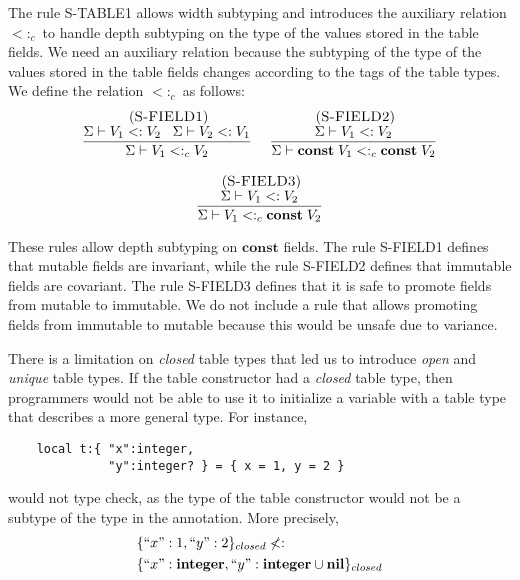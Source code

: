 \documentclass{sigplanconf}
\newcommand{\Nil}{\mathbf{nil}}
\newcommand{\Integer}{\mathbf{integer}}
\newcommand{\Const}{\mathbf{const}}
\newcommand{\mylabel}[1]{\; (\textsc{#1})}
\newcommand{\senv}{\Sigma}
\newcommand{\subtype}{<:}
\begin{document}
The rule \textsc{S-TABLE1} allows width subtyping and introduces the
auxiliary relation $\subtype_{c}$ to handle depth subtyping on the
type of the values stored in the table fields.
We need an auxiliary relation because the subtyping of the
type of the values stored in the table fields changes according to
the tags of the table types.
We define the relation $\subtype_{c}$ as follows:
\[
\begin{array}{c}
\begin{array}{c}
\mylabel{S-FIELD1}\\
\dfrac{\senv \vdash V_{1} \subtype V_{2} \;\;\;
       \senv \vdash V_{2} \subtype V_{1}}
      {\senv \vdash V_{1} \subtype_{c} V_{2}}
\end{array}
\;
\begin{array}{c}
\mylabel{S-FIELD2}\\
\dfrac{\senv \vdash V_{1} \subtype V_{2}}
      {\senv \vdash \Const \; V_{1} \subtype_{c} \Const \; V_{2}}
\end{array}
\\ \\
\begin{array}{c}
\mylabel{S-FIELD3}\\
\dfrac{\senv \vdash V_{1} \subtype V_{2}}
      {\senv \vdash V_{1} \subtype_{c} \Const \; V_{2}}
\end{array}
\end{array}
\]

These rules allow depth subtyping on $\Const$ fields.
The rule \textsc{S-FIELD1} defines that mutable fields are invariant,
while the rule \textsc{S-FIELD2} defines that immutable fields are covariant.
The rule \textsc{S-FIELD3} defines that it is safe to promote fields
from mutable to immutable.
We do not include a rule that allows promoting fields from immutable
to mutable because this would be unsafe due to variance.

There is a limitation on \emph{closed} table types that led us to
introduce \emph{open} and \emph{unique} table types.
If the table constructor had a \emph{closed} table type, then
programmers would not be able to use it to initialize a variable with
a table type that describes a more general type.
For instance,
\begin{verbatim}
    local t:{ "x":integer,
              "y":integer? } = { x = 1, y = 2 }
\end{verbatim}
would not type check, as the type of the table constructor would not
be a subtype of the type in the annotation.
More precisely,
\begin{align*}
& \{``x":1, ``y":2\}_{closed} \not\subtype \\
& \{``x":\Integer, ``y":\Integer \cup \Nil\}_{closed}
\end{align*}
\end{document}
